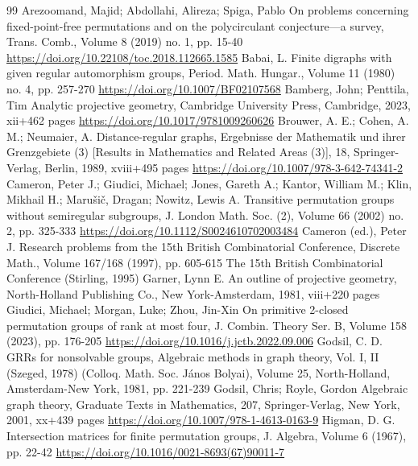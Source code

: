\documentclass[10pt]{amsart}
\theoremstyle{definition}
\theoremstyle{plain}
\theoremstyle{plain}
\theoremstyle{plain}
\theoremstyle{plain}
\begin{document}
\begin{thebibliography}{99}
 Arezoomand, Majid; Abdollahi, Alireza; Spiga, Pablo On problems concerning fixed-point-free permutations and on the polycirculant conjecture—a survey, Trans. Comb., Volume 8 (2019) no. 1, pp. 15-40 \url{https://doi.org/10.22108/toc.2018.112665.1585}
 Babai, L. Finite digraphs with given regular automorphism groups, Period. Math. Hungar., Volume 11 (1980) no. 4, pp. 257-270 \url{https://doi.org/10.1007/BF02107568}
 Bamberg, John; Penttila, Tim Analytic projective geometry, Cambridge University Press, Cambridge, 2023, xii+462 pages \url{https://doi.org/10.1017/9781009260626}
 Brouwer, A. E.; Cohen, A. M.; Neumaier, A. Distance-regular graphs, Ergebnisse der Mathematik und ihrer Grenzgebiete (3) [Results in Mathematics and Related Areas (3)], 18, Springer-Verlag, Berlin, 1989, xviii+495 pages \url{https://doi.org/10.1007/978-3-642-74341-2}
 Cameron, Peter J.; Giudici, Michael; Jones, Gareth A.; Kantor, William M.; Klin, Mikhail H.; Marušič, Dragan; Nowitz, Lewis A. Transitive permutation groups without semiregular subgroups, J. London Math. Soc. (2), Volume 66 (2002) no. 2, pp. 325-333 \url{https://doi.org/10.1112/S0024610702003484}
 Cameron (ed.), Peter J. Research problems from the 15th British Combinatorial Conference, Discrete Math., Volume 167/168 (1997), pp. 605-615 The 15th British Combinatorial Conference (Stirling, 1995)
 Garner, Lynn E. An outline of projective geometry, North-Holland Publishing Co., New York-Amsterdam, 1981, viii+220 pages
 Giudici, Michael; Morgan, Luke; Zhou, Jin-Xin On primitive 2-closed permutation groups of rank at most four, J. Combin. Theory Ser. B, Volume 158 (2023), pp. 176-205 \url{https://doi.org/10.1016/j.jctb.2022.09.006}
 Godsil, C. D. GRRs for nonsolvable groups, Algebraic methods in graph theory, Vol. I, II (Szeged, 1978) (Colloq. Math. Soc. János Bolyai), Volume 25, North-Holland, Amsterdam-New York, 1981, pp. 221-239
 Godsil, Chris; Royle, Gordon Algebraic graph theory, Graduate Texts in Mathematics, 207, Springer-Verlag, New York, 2001, xx+439 pages \url{https://doi.org/10.1007/978-1-4613-0163-9}
 Higman, D. G. Intersection matrices for finite permutation groups, J. Algebra, Volume 6 (1967), pp. 22-42 \url{https://doi.org/10.1016/0021-8693(67)90011-7}

\end{thebibliography}
\end{document}
